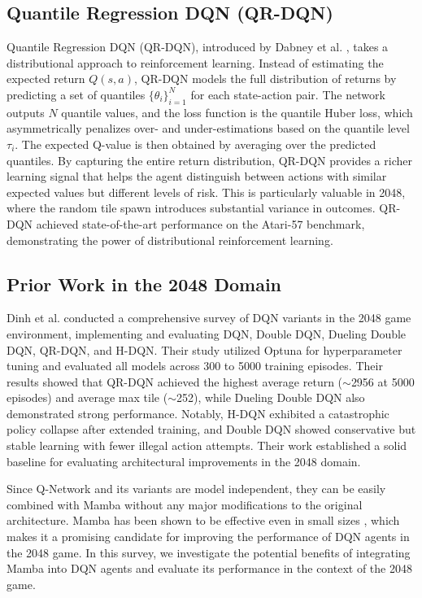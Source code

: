 \documentclass[conference]{IEEEtran}
\begin{document}
\subsection{Quantile Regression DQN (QR-DQN)}

Quantile Regression DQN (QR-DQN), introduced by Dabney et al. \cite{dabney2018distributional}, takes a distributional approach to reinforcement learning. Instead of estimating the expected return $Q(s, a)$, QR-DQN models the full distribution of returns by predicting a set of quantiles $\{\theta_i\}_{i=1}^N$ for each state-action pair. The network outputs $N$ quantile values, and the loss function is the quantile Huber loss, which asymmetrically penalizes over- and under-estimations based on the quantile level $\tau_i$. The expected Q-value is then obtained by averaging over the predicted quantiles. By capturing the entire return distribution, QR-DQN provides a richer learning signal that helps the agent distinguish between actions with similar expected values but different levels of risk. This is particularly valuable in 2048, where the random tile spawn introduces substantial variance in outcomes. QR-DQN achieved state-of-the-art performance on the Atari-57 benchmark, demonstrating the power of distributional reinforcement learning.

\subsection{Prior Work in the 2048 Domain}

Dinh et al. \cite{dinh2024report} conducted a comprehensive survey of DQN variants in the 2048 game environment, implementing and evaluating DQN, Double DQN, Dueling Double DQN, QR-DQN, and H-DQN. Their study utilized Optuna for hyperparameter tuning and evaluated all models across 300 to 5000 training episodes. Their results showed that QR-DQN achieved the highest average return ($\sim$2956 at 5000 episodes) and average max tile ($\sim$252), while Dueling Double DQN also demonstrated strong performance. Notably, H-DQN exhibited a catastrophic policy collapse after extended training, and Double DQN showed conservative but stable learning with fewer illegal action attempts. Their work established a solid baseline for evaluating architectural improvements in the 2048 domain.

Since Q-Network and its variants are model independent, they can be easily combined with Mamba without any major modifications to the original architecture. Mamba has been shown to be effective even in small sizes \cite{gu2023mamba}, which makes it a promising candidate for improving the performance of DQN agents in the 2048 game. In this survey, we investigate the potential benefits of integrating Mamba into DQN agents and evaluate its performance in the context of the 2048 game.
\end{document}
